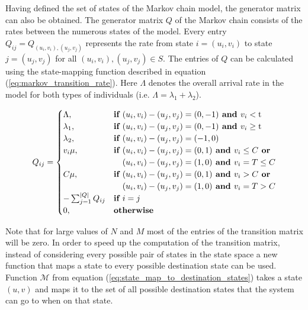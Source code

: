 Having defined the set of states of the Markov chain model, the generator
matrix can also be obtained.
The generator matrix \(Q\) of the Markov chain consists of the
rates between the numerous states of the model.
Every entry \( Q_{ij} = Q_{(u_i, v_i),(u_j, v_j)} \) represents the rate from
state \( i = (u_i, v_i) \) to state \( j = (u_j , v_j) \) for all
\( (u_i, v_i), (u_j, v_j) \in S \).
The entries of \(Q\) can be calculated using the state-mapping function
described in equation (\ref{eq:markov_transition_rate}).
Here \(\Lambda\) denotes the overall arrival rate in the model for
both types of individuals (i.e. \(\Lambda = \lambda_1 + \lambda_2\)).

\begin{equation} \label{eq:markov_transition_rate}
    Q_{ij} =
    \begin{cases}
        \Lambda, & \textbf{if } (u_i, v_i) - (u_j, v_j) = (0,-1) \textbf{ and }
        v_i < \text{t} \\
        \lambda_1, & \textbf{if } (u_i, v_i) - (u_j, v_j) = (0,-1)
        \textbf{ and } v_i \geq \text{t} \\
        \lambda_2, & \textbf{if } (u_i, v_i) - (u_j, v_j) = (-1,0) \\
        v_i \mu, & \textbf{if } (u_i, v_i) - (u_j, v_j) = (0,1) \textbf{ and }
        v_i \leq C \textbf{ or} \\ & \hspace{0.37cm}(u_i, v_i) - (u_j, v_j) =
        (1,0) \textbf{ and } v_i = T \leq C \\
        C \mu, & \textbf{if } (u_i, v_i) - (u_j, v_j) = (0,1) \textbf{ and }
        v_i > C
        \textbf{ or} \\ & \hspace{0.37cm}(u_i, v_i) - (u_j, v_j) = (1,0)
        \textbf{ and } v_i = T > C\\
        -\sum_{j=1}^{|Q|}{Q_{ij}} & \textbf{if } i = j \\
        0, & \textbf{otherwise}
    \end{cases}
\end{equation}

Note that for large values of \(N\) and \(M\) most of the entries of the
transition matrix will be zero.
In order to speed up the computation of the transition matrix, instead of
considering every possible pair of states in the state space a new function
that maps a state to every possible destination state can be used.
Function \(\mathcal{M}\) from equation (\ref{eq:state_map_to_destination_states})
takes a state \((u, v)\) and maps it to the set of
all possible destination states that the system can go to when on that state.

